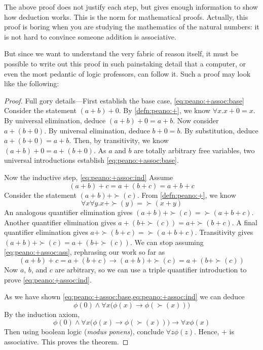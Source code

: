 \documentclass{scrbook}
\renewcommand{\implies}{\to}
\begin{document}
The above proof does not justify each step, but gives enough information to show how deduction works. This is the norm for mathematical proofs. Actually, this proof is boring when you are studying the mathematics of the natural numbers: it is not hard to convince someone addition is associative. 

But since we want to understand the very fabric of reason itself, it must be possible to write out this proof in such painstaking detail that a computer, or even the most pedantic of logic professors, can follow it. Such a proof may look like the following: 

\begin{proof}
  Full gory details---First establish the base case, \cref{eq:peano:+assoc:base}
  Consider the statement $(a+b)+0$. By \cref{defn:peano:+}, we know $\forall x . x+0=x$. By universal elimination, deduce $(a+b)+0=a+b$. Now consider
  $a+(b+0)$. By universal elimination, deduce $b+0=b$. By substitution, deduce $a+(b+0)=a+b$. Then, by transitivity, we know $(a+b)+0=a+(b+0)$. As $a$ and $b$ are totally arbitrary free variables, two universal introductions establish \cref{eq:peano:+assoc:base}.

  Now the inductive step, \cref{eq:peano:+assoc:ind}
  Assume \begin{equation}(a+b)+c=a+(b+c)=a+b+c\label{eq:peano:+assoc:ass}\end{equation}
  Consider the statement $(a+b)+\succ (c)$. From \cref{defn:peano:+}, we know
  \[\forall x \forall y . x+\succ(y)=\succ(x+y)\]
  An analogous quantifier elimination gives $(a+b)+\succ (c) = \succ(a+b+c)$. 
  Another quantifier elimination gives $a+(b+\succ(c))= a+\succ(b+c)$. A final quantifier elimination gives $a+\succ(b+c)=\succ(a+b+c)$. Transitivity gives $(a+b)+\succ(c)=a+(b+\succ(c))$. We can stop assuming \cref{eq:peano:+assoc:ass}, rephrasing our work so far as
  \[
  (a+b)+c=a+(b+c)\implies (a+b)+\succ(c) = a+(b+\succ (c))
  \]
  Now $a$, $b$, and $c$ are arbitrary, so we can use a triple quantifier introduction to prove \cref{eq:peano:+assoc:ind}. 

  As we have shown \cref{eq:peano:+assoc:base,eq:peano:+assoc:ind} we can deduce 
  \begin{equation}
    \label{eq:peano:+assoc:both}
    \phi(0)\wedge \forall x \bigl(\phi(x)\implies \phi(\succ(x))\bigr)
  \end{equation}
  By the induction axiom, 
  \[
  \phi(0)\wedge \forall x \bigl(\phi(x)\implies \phi(\succ(x))\bigr) \implies \forall x \phi(x)
  \]
  Then using boolean logic (\emph{modus ponens}), conclude $\forall z \phi(z)$. Hence, $+$ is associative. This proves the theorem. 
\end{proof}
\end{document}
